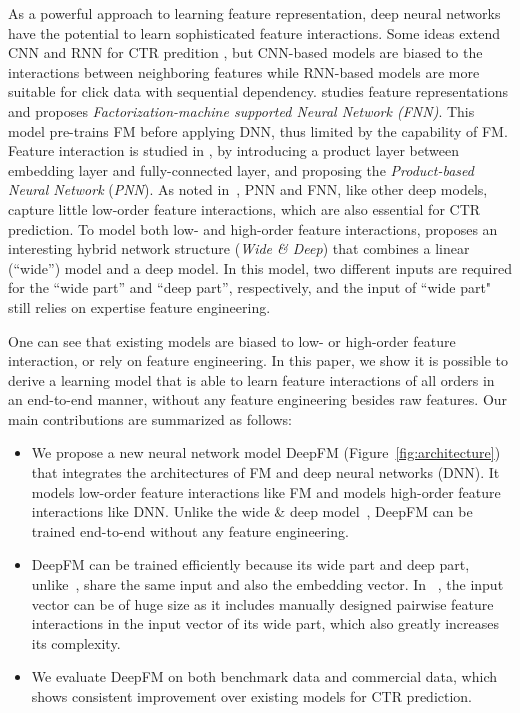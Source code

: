 As a powerful approach to learning feature representation, deep neural networks  have the potential to learn sophisticated feature interactions. Some ideas extend CNN and RNN for CTR predition \cite{cnn,rnn}, but CNN-based models are biased to the interactions between neighboring features while RNN-based models are more suitable for click data with sequential dependency. \cite{fnn} studies feature representations and proposes \emph{Factorization-machine supported Neural Network (FNN)}. This model pre-trains FM before applying DNN, thus limited by the capability of FM. Feature interaction is studied in \cite{pnn}, by introducing a product layer between embedding layer and fully-connected layer, and proposing the \emph{Product-based Neural Network} (\emph{PNN}). As noted in~\cite{wide-n-deep}, PNN and FNN, like other deep models, capture little low-order feature interactions, which are also essential for CTR prediction. To model both low- and high-order feature interactions, \cite{wide-n-deep} proposes an interesting hybrid network structure (\emph{Wide \& Deep}) that combines a linear (``wide'') model and a deep model. In this model, two different inputs are required for the ``wide part'' and ``deep part'', respectively, and the input of ``wide part" still relies on expertise feature engineering.



One can see that existing models are biased to low- or high-order feature interaction, or rely on feature engineering. In this paper, we show it is possible to derive a learning model that is able to learn feature interactions of all orders in an end-to-end manner, without any feature engineering besides raw features. Our main contributions are summarized as follows:
\begin{itemize}
\item We propose a new neural network model DeepFM (Figure~\ref{fig:architecture}) that integrates the architectures of FM and deep neural networks (DNN). It models low-order feature interactions like FM and models high-order feature interactions like DNN. Unlike the wide \& deep model~\cite{wide-n-deep}, DeepFM can be trained end-to-end without any feature engineering.
\item DeepFM can be trained efficiently because its wide part and deep part, unlike~\cite{wide-n-deep}, share the same input and also the embedding vector. In ~\cite{wide-n-deep}, the input vector can be of huge size as it includes manually designed pairwise feature interactions in the input vector of its wide part, which also greatly increases its complexity.
\item We evaluate DeepFM on both benchmark data and commercial data, which shows consistent improvement over existing models for CTR prediction.
\end{itemize}


